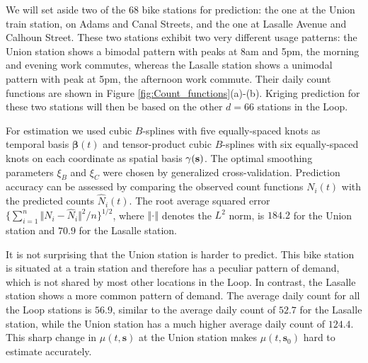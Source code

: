 \documentclass[titlepage,12pt]{article}
\begin{document}

We will set aside two of the 68 bike stations for prediction: the one at the
Union train station, on Adams and Canal Streets, and the one at Lasalle
Avenue and Calhoun Street. These two stations exhibit two very different
usage patterns: the Union station shows a bimodal pattern with peaks at 8am
and 5pm, the morning and evening work commutes, whereas the Lasalle station
shows a unimodal pattern with peak at 5pm, the afternoon work commute. Their
daily count functions are shown in Figure \ref{fig:Count_functions}(a)-(b).
Kriging prediction for these two stations will then be based on the other $%
d=66$ stations in the Loop.

For estimation we used cubic $B$-splines with five equally-spaced knots as
temporal basis $\mathbf{\beta }(t)$ and tensor-product cubic $B$-splines
with six equally-spaced knots on each coordinate as spatial basis $\mathbf{%
\gamma }(\mathbf{s})$. The optimal smoothing parameters $\xi _{B}$ and $\xi
_{C}$ were chosen by generalized cross-validation. Prediction accuracy can
be assessed by comparing the observed count functions $N_{i}(t)$ with the
predicted counts $\hat{N}_{i}(t)$. The root average squared error $%
\{\sum_{i=1}^{n}\Vert N_{i}-\hat{N}_{i}\Vert ^{2}/n\}^{1/2}$, where $%
\left\Vert \cdot \right\Vert $ denotes the $L^{2}$ norm, is $184.2$ for the
Union station and $70.9$ for the Lasalle station.

It is not surprising that the Union station is harder to predict. This bike
station is situated at a train station and therefore has a peculiar pattern
of demand, which is not shared by most other locations in the Loop. In
contrast, the Lasalle station shows a more common pattern of demand. The
average daily count for all the Loop stations is $56.9$, similar to the
average daily count of $52.7$ for the Lasalle station, while the Union
station has a much higher average daily count of $124.4$. This sharp change
in $\mu (t,\mathbf{s})$ at the Union station makes $\mu (t,\mathbf{s}_{0})$
hard to estimate accurately.
\end{document}
